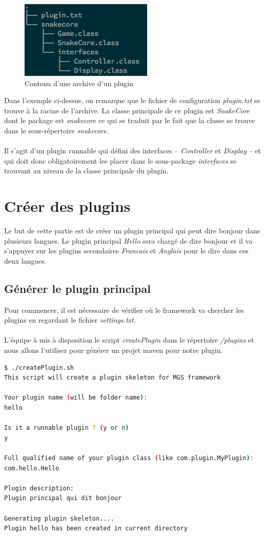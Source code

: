 \documentclass[12pt,a4paper]{article}
\begin{document}
\begin{figure}[h]
   \centering
   \includegraphics{ressources/plugin-organization.png}
   \caption{Contenu d'une archive d'un plugin}
\end{figure}

Dans l'exemple ci-dessus, on remarque que le fichier de configuration 
\emph{plugin.txt} se trouve à la racine de l'archive. La classe principale de ce 
plugin est \emph{SnakeCore} dont le package est \emph{snakecore} ce qui se traduit 
par le fait que la classe se trouve dans le sous-répertoire \emph{snakecore}.
\\\\
Il s'agit d'un plugin runnable qui défini des interfaces -- \emph{Controller} et 
\emph{Display} -- et qui doit donc obligatoirement les placer dans le sous-package 
\emph{interfaces} se trouvant au niveau de la classe principale du plugin.

\section{Créer des plugins}
Le but de cette partie est de créer un plugin principal qui peut dire bonjour dans 
plusieurs langues. Le plugin principal \emph{Hello} sera chargé de dire bonjour et 
il va s'appuyer sur les plugins secondaires \emph{Francais} et \emph{Anglais} pour 
le dire dans ces deux langues.

\subsection{Générer le plugin principal}
Pour commencer, il est nécessaire de vérifier où le framework va chercher les 
plugins en regardant le fichier \emph{settings.txt}.
\\\\
L'équipe à mis à disposition le script \emph{createPlugin} dans le répertoire 
\emph{/plugins} et nous allons l'utiliser pour générer un projet maven pour notre 
plugin.

\begin{lstlisting}[language=bash,caption=Création du plugin hello]
$ ./createPlugin.sh 
This script will create a plugin skeleton for MGS framework

Your plugin name (will be folder name):
hello

Is it a runnable plugin ? (y or n)
y

Full qualified name of your plugin class (like com.plugin.MyPlugin):
com.hello.Hello

Plugin description:
Plugin principal qui dit bonjour

Generating plugin skeleton....
Plugin hello has been created in current directory
\end{lstlisting}
\end{document}

